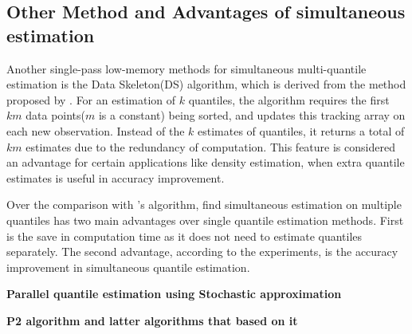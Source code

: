     \subsection{Other Method and Advantages of simultaneous estimation\cite{mcdermottDataSkeletonsSimultaneous2007}}

    Another single-pass low-memory methods for simultaneous multi-quantile estimation is the Data Skeleton(DS)\cite{mcdermottDataSkeletonsSimultaneous2007} algorithm, which is derived from the method proposed by \citeauthor{liechtySinglepassLowstorageArbitrary} \cite{liechtySinglepassLowstorageArbitrary}. For an estimation of $k$ quantiles, the algorithm requires the first $km$ data points($m$ is a constant) being sorted, and updates this tracking array on each new observation. Instead of the $k$ estimates of quantiles, it returns a total of $km$ estimates due to the redundancy of computation. This feature is considered an advantage for certain applications like density estimation, when extra quantile estimates is useful in accuracy improvement.


    Over the comparison with \citeauthor{liechtySinglepassLowstorageArbitrary}'s algorithm, \citeauthor{mcdermottDataSkeletonsSimultaneous2007}\cite{mcdermottDataSkeletonsSimultaneous2007} find simultaneous estimation on multiple quantiles has two main advantages over single quantile estimation methods. First is the save in computation time as it does not need to estimate quantiles separately. The second advantage, according to the experiments, is the accuracy improvement in simultaneous quantile estimation.  


    
\textbf{
    Parallel quantile estimation using Stochastic approximation \cite{hammerSmoothEstimatesMultiple2019}
}

\textbf{P2 algorithm and latter algorithms that based on it}


\fi